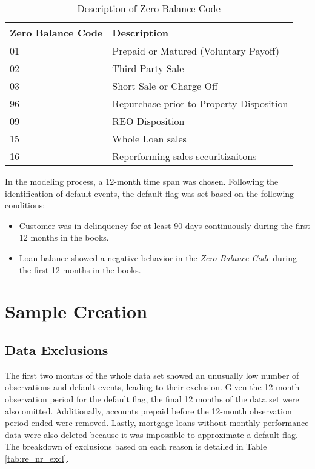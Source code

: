 \begin{table}[H]
\centering
\begin{tabular}{ l l }\toprule
\textbf{Zero Balance Code} & \textbf{Description}            \\\midrule
01                & Prepaid or Matured (Voluntary Payoff)    \\
02                & Third Party Sale                         \\
03                & Short Sale or Charge Off                 \\
96                & Repurchase prior to Property Disposition \\
09                & REO Disposition                          \\
15                & Whole Loan sales                         \\
16                & Reperforming sales securitizaitons \\\bottomrule
\end{tabular}%
\caption{Description of Zero Balance Code}
\label{tab:re_ZB_Descr}
\end{table}

In the modeling process, a 12-month time span was chosen. Following the identification of default events, the default flag was set based on the following conditions:

\begin{itemize}
  \item Customer was in delinquency for at least 90 days continuously during the first 12 months in the books.
  \item Loan balance showed a negative behavior in the \emph{Zero Balance Code} during the first 12 months in the books.
\end{itemize}

\section{Sample Creation}

\subsection{Data Exclusions}
The first two months of the whole data set showed an unusually low number of observations and default events, leading to their exclusion. Given the 12-month observation period for the default flag, the final 12 months of the data set were also omitted. Additionally, accounts prepaid before the 12-month observation period ended were removed. Lastly, mortgage loans without monthly performance data were also deleted because it was impossible to approximate a default flag. The breakdown of exclusions based on each reason is detailed in Table \ref{tab:re_nr_excl}.

